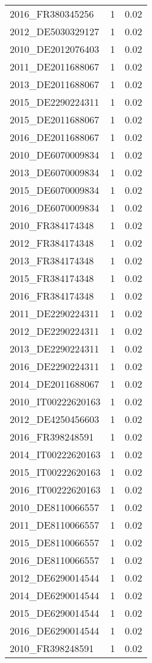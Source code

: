 \begin{table*}[htbp]
\begin{tabular}{lrr}
2016_FR380345256 & 1 & 0.02 \\
2012_DE5030329127 & 1 & 0.02 \\
2010_DE2012076403 & 1 & 0.02 \\
2011_DE2011688067 & 1 & 0.02 \\
2013_DE2011688067 & 1 & 0.02 \\
2015_DE2290224311 & 1 & 0.02 \\
2015_DE2011688067 & 1 & 0.02 \\
2016_DE2011688067 & 1 & 0.02 \\
2010_DE6070009834 & 1 & 0.02 \\
2013_DE6070009834 & 1 & 0.02 \\
2015_DE6070009834 & 1 & 0.02 \\
2016_DE6070009834 & 1 & 0.02 \\
2010_FR384174348 & 1 & 0.02 \\
2012_FR384174348 & 1 & 0.02 \\
2013_FR384174348 & 1 & 0.02 \\
2015_FR384174348 & 1 & 0.02 \\
2016_FR384174348 & 1 & 0.02 \\
2011_DE2290224311 & 1 & 0.02 \\
2012_DE2290224311 & 1 & 0.02 \\
2013_DE2290224311 & 1 & 0.02 \\
2016_DE2290224311 & 1 & 0.02 \\
2014_DE2011688067 & 1 & 0.02 \\
2010_IT00222620163 & 1 & 0.02 \\
2012_DE4250456603 & 1 & 0.02 \\
2016_FR398248591 & 1 & 0.02 \\
2014_IT00222620163 & 1 & 0.02 \\
2015_IT00222620163 & 1 & 0.02 \\
2016_IT00222620163 & 1 & 0.02 \\
2010_DE8110066557 & 1 & 0.02 \\
2011_DE8110066557 & 1 & 0.02 \\
2015_DE8110066557 & 1 & 0.02 \\
2016_DE8110066557 & 1 & 0.02 \\
2012_DE6290014544 & 1 & 0.02 \\
2014_DE6290014544 & 1 & 0.02 \\
2015_DE6290014544 & 1 & 0.02 \\
2016_DE6290014544 & 1 & 0.02 \\
2010_FR398248591 & 1 & 0.02 \\

\end{tabular}
\end{table*}
